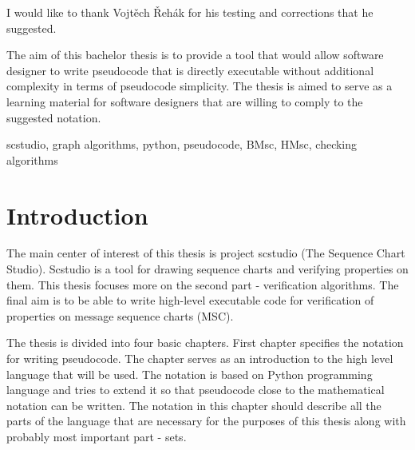 \documentclass[11pt,oneside]{fithesis2}
\begin{document}
\lstset{language=Python,breaklines,stepnumber=1,numbers=right,numberstyle=\tiny,numbersep=5pt}
\FrontMatter  
\ThesisTitlePage  
 
\begin{ThesisDeclaration}  
\DeclarationText  
\AdvisorName  
\end{ThesisDeclaration}  
 
\begin{ThesisThanks} 
I would like to thank Vojtěch Řehák for his testing and corrections that he suggested.
\end{ThesisThanks}  

\begin{ThesisAbstract}  
The aim of this bachelor thesis is to provide a tool that would allow software designer to write pseudocode that is directly executable without additional complexity in terms of pseudocode simplicity. The thesis is aimed to serve as a learning material for software designers that are willing to comply to the suggested notation.


\end{ThesisAbstract}  

\begin{ThesisKeyWords}  
scstudio, graph algorithms, python, pseudocode, BMsc, HMsc, checking algorithms
\end{ThesisKeyWords}  
 
\MainMatter  
\tableofcontents          %
 
\chapter{Introduction}    %
The main center of interest of this thesis is project scstudio (The Sequence Chart Studio)\cite{scstudio,scstudio2}. Scstudio is a tool for drawing sequence charts and verifying properties on them. This thesis focuses more on the second part - verification algorithms. The final aim is to be able to write high-level executable code for verification of properties on message sequence charts (MSC).

The thesis is divided into four basic chapters. First chapter specifies the notation for writing pseudocode. The chapter serves as an introduction to the high level language that will be used. The notation is based on Python\cite{python,python2} programming language and tries to extend it so that pseudocode close to the mathematical notation can be written. The notation in this chapter should describe all the parts of the language that are necessary for the purposes of this thesis along with probably most important part - sets.
\end{document}
